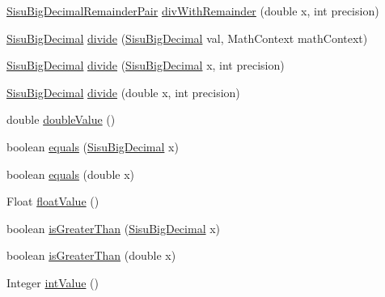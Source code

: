 \begin{DoxyCompactItemize}
\item 
\hyperlink{classcom_1_1aarrelaakso_1_1drawl_1_1_sisu_big_decimal_remainder_pair}{Sisu\+Big\+Decimal\+Remainder\+Pair} \hyperlink{classcom_1_1aarrelaakso_1_1drawl_1_1_sisu_big_decimal_a8707dfd3e59cee5e599d6a8a469b7f0d}{div\+With\+Remainder} (double x, int precision)
\item 
\hyperlink{classcom_1_1aarrelaakso_1_1drawl_1_1_sisu_big_decimal}{Sisu\+Big\+Decimal} \hyperlink{classcom_1_1aarrelaakso_1_1drawl_1_1_sisu_big_decimal_ac1dbd016deb958fa7332bf3a777d14e2}{divide} (\hyperlink{classcom_1_1aarrelaakso_1_1drawl_1_1_sisu_big_decimal}{Sisu\+Big\+Decimal} val, Math\+Context math\+Context)
\item 
\hyperlink{classcom_1_1aarrelaakso_1_1drawl_1_1_sisu_big_decimal}{Sisu\+Big\+Decimal} \hyperlink{classcom_1_1aarrelaakso_1_1drawl_1_1_sisu_big_decimal_ae205ef47f514e99e0ca571001ad1ea69}{divide} (\hyperlink{classcom_1_1aarrelaakso_1_1drawl_1_1_sisu_big_decimal}{Sisu\+Big\+Decimal} x, int precision)
\item 
\hyperlink{classcom_1_1aarrelaakso_1_1drawl_1_1_sisu_big_decimal}{Sisu\+Big\+Decimal} \hyperlink{classcom_1_1aarrelaakso_1_1drawl_1_1_sisu_big_decimal_a434a75dd442a5dc4ccb8a7af48ff4728}{divide} (double x, int precision)
\item 
double \hyperlink{classcom_1_1aarrelaakso_1_1drawl_1_1_sisu_big_decimal_a4b69c8b90193583069b152ffa4fec2a6}{double\+Value} ()
\item 
boolean \hyperlink{classcom_1_1aarrelaakso_1_1drawl_1_1_sisu_big_decimal_a0bec7f1090a853692b13cbf387f8b11a}{equals} (\hyperlink{classcom_1_1aarrelaakso_1_1drawl_1_1_sisu_big_decimal}{Sisu\+Big\+Decimal} x)
\item 
boolean \hyperlink{classcom_1_1aarrelaakso_1_1drawl_1_1_sisu_big_decimal_ac3db8159d68b7b6d5fb518ac735b788e}{equals} (double x)
\item 
Float \hyperlink{classcom_1_1aarrelaakso_1_1drawl_1_1_sisu_big_decimal_ad797c1167dea95aadaa653ee7f3cbf91}{float\+Value} ()
\item 
boolean \hyperlink{classcom_1_1aarrelaakso_1_1drawl_1_1_sisu_big_decimal_ab9dc87c361a7ffd236c1cee1bc677f12}{is\+Greater\+Than} (\hyperlink{classcom_1_1aarrelaakso_1_1drawl_1_1_sisu_big_decimal}{Sisu\+Big\+Decimal} x)
\item 
boolean \hyperlink{classcom_1_1aarrelaakso_1_1drawl_1_1_sisu_big_decimal_a89df07cdc9c356d097db099d609335dc}{is\+Greater\+Than} (double x)
\item 
Integer \hyperlink{classcom_1_1aarrelaakso_1_1drawl_1_1_sisu_big_decimal_a8d02465f77c81ac072066766db81d196}{int\+Value} ()

\end{DoxyCompactItemize}
